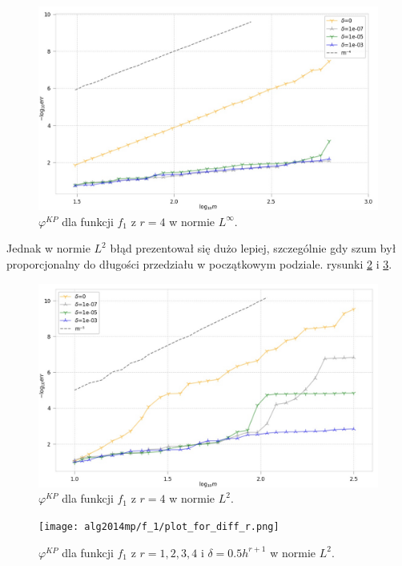 \documentclass[oik, pdftex, man]{mgrwms}
\begin{document}
    \begin{figure}
        \centering
        \includegraphics[width=.9\linewidth]{alg2014mp/f_1/r_3/p_infinity/plot_30evaluation_0.jpg}
        \caption{$\varphi^{KP}$ dla funkcji $f_{1}$ z $r = 4$ w normie $L^{\infty}$.}
        \label{rys:4:algKP_dla_zaburzonej_p_inf}
    \end{figure}
    Jednak w normie $L^{2}$ błąd prezentował się dużo lepiej, szczególnie gdy szum był proporcjonalny do długości przedziału w początkowym podziale. rysunki \ref{rys:7:algKP_zaburzona_ale_dla_L2} i \ref{rys:7:different_r}.
    \begin{figure}
        \centering
        \includegraphics[width=.9\linewidth]{alg2014mp/f_1/r_4/p_2/plot_200evaluation_0.jpg}
        \caption{$\varphi^{KP}$ dla funkcji $f_{1}$ z $r = 4$ w normie $L^{2}$.}
        \label{rys:7:algKP_zaburzona_ale_dla_L2}
    \end{figure}
    \begin{figure}
        \centering
        \texttt{[image: alg2014mp/f\_1/plot\_for\_diff\_r.png]}
        \caption{$\varphi^{KP}$ dla funkcji $f_{1}$ z $r = 1,2,3,4$ i $\delta=0.5h^{r+1}$ w normie $L^{2}$.}
        \label{rys:7:different_r}
    \end{figure}
    
\end{document}
